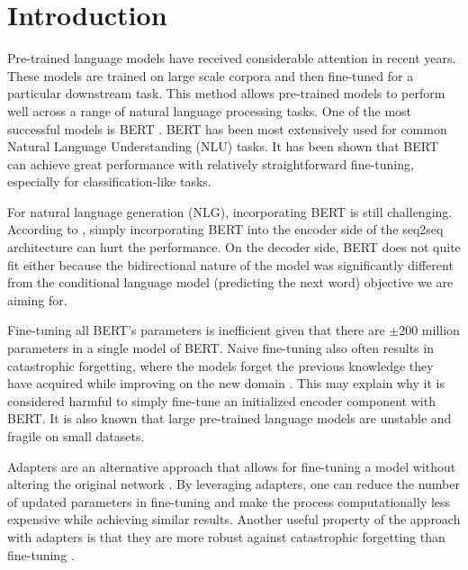 \chapter*{Introduction}
Pre-trained language models \cite{devlin2018bert,howard2018universal} have received considerable attention in recent years. These models are trained on large scale corpora and then fine-tuned for a particular downstream task. This method allows pre-trained models to perform well across a range of natural language processing tasks. One of the most successful models is BERT \cite{devlin2018bert}. BERT has been most extensively used for common Natural Language Understanding (NLU) tasks. It has been shown that BERT can achieve great performance with relatively straightforward fine-tuning, especially for classification-like tasks.

For natural language generation (NLG), incorporating BERT is still challenging. According to \citet{zhu2020incorporating}, simply incorporating BERT into the encoder side of the seq2seq architecture can hurt the performance. On the decoder side, BERT does not quite fit either because the bidirectional nature of the model was significantly different from the conditional language model (predicting the next word) objective we are aiming for.

Fine-tuning all BERT's parameters is inefficient given that there are $\pm$200 million parameters in a single model of BERT. Naive fine-tuning also often results in catastrophic forgetting, where the models forget the previous knowledge they have acquired while improving on the new domain \cite{mccloskey1989catastrophic,yogatama2019learning}. This may explain why it is considered harmful to simply fine-tune an initialized encoder component with BERT. It is also known that large pre-trained language models are unstable and fragile on small datasets.

Adapters are an alternative approach that allows for fine-tuning a model without altering the original network \cite{houlsby2019parameter,bapna2019simple}. By leveraging adapters, one can reduce the number of updated parameters in fine-tuning and make the process computationally less expensive while achieving similar results. Another useful property of the approach with adapters is that they are more robust against catastrophic forgetting than fine-tuning \cite{han2021robust}.

